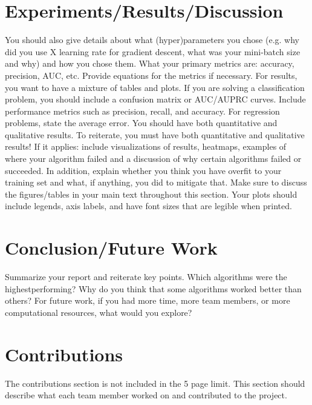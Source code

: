 \documentclass{article}
\begin{document}
\section{Experiments/Results/Discussion}
You should also give details about what (hyper)parameters you chose (e.g. why did you
use X learning rate for gradient descent, what was your mini-batch size and why) and how
you chose them. What your primary metrics are: accuracy, precision,
AUC, etc. Provide equations for the metrics if necessary. For results, you want to have a
mixture of tables and plots. If you are solving a classification problem, you should include a
confusion matrix or AUC/AUPRC curves. Include performance metrics such as precision,
recall, and accuracy. For regression problems, state the average error. You should have
both quantitative and qualitative results. To reiterate, you must have both quantitative
and qualitative results! If it applies: include visualizations of results, heatmaps,
examples of where your algorithm failed and a discussion of why certain algorithms failed
or succeeded. In addition, explain whether you think you have overfit to your training set
and what, if anything, you did to mitigate that. Make sure to discuss the figures/tables in
your main text throughout this section. Your plots should include legends, axis labels, and
have font sizes that are legible when printed.

\section{Conclusion/Future Work }
Summarize your report and reiterate key points. Which algorithms were the highestperforming?
Why do you think that some algorithms worked better than others? For
future work, if you had more time, more team members, or more computational resources,
what would you explore?

\section{Contributions}
The contributions section is not included in the 5 page limit. This section should describe
what each team member worked on and contributed to the project.
\end{document}

